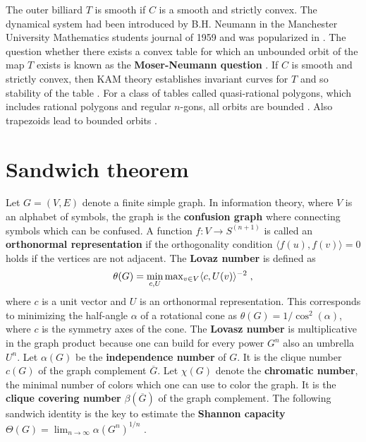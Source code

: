 \documentclass[12pt]{amsart}
\begin{document}
The outer billiard $T$ is smooth if $C$ is a smooth and strictly convex. 
The dynamical system had been introduced by B.H. Neumann in the Manchester University Mathematics
students journal of 1959 \cite{Neumann1959} and was popularized in 
\cite{MoserStableRandom,Mos78}. The question whether there exists a convex table for which
an unbounded orbit of the map $T$ exists is known as the {\bf Moser-Neumann question}
\cite{Schwartz2007,Schwartz2009}. If $C$ is smooth and strictly convex, then KAM theory
establishes invariant curves for $T$ and so stability of the table \cite{Dou82}.
For a class of tables called quasi-rational polygons, which includes rational polygons and 
regular $n$-gons, all orbits are bounded \cite{ViSh87,Kolodziej,GutkinSimanyi}. Also trapezoids
lead to bounded orbits \cite{Li2009}.


\section{Sandwich theorem}

Let $G=(V,E)$ denote a finite simple graph. In information theory, where
$V$ is an alphabet of symbols, the graph is the {\bf confusion graph} where
connecting symbols which can be confused. A function $f: V \to S^(n+1)$
is called an {\bf orthonormal representation} if the orthogonality condition
$\langle f(u),f(v) \rangle=0$ holds if the vertices are not adjacent.
The {\bf Lovaz number} is defined as
$$  \theta(G) = \min_{c,U} {\rm max}_{v \in V} \langle c,U(v) \rangle^{-2}  \; , $$
where $c$ is a unit vector and $U$ is an orthonormal representation.
This corresponds to minimizing the half-angle $\alpha$ of a rotational cone
as $\theta(G) = 1/\cos^2(\alpha)$, where $c$ is the symmetry axes of
the cone. The {\bf Lovasz number} is multiplicative in the graph product because one
can build for every power $G^n$ also an umbrella $U^n$.
Let $\alpha(G)$ be the {\bf independence number} of $G$. It is the clique number $c(G)$
of the graph complement $\overline{G}$. Let $\chi(G)$ denote the {\bf chromatic
number}, the minimal number of colors which one can use to color the graph. It is
the {\bf clique covering number} $\beta(\overline{G})$ of the graph complement. The following
sandwich identity is the key to estimate the {\bf Shannon capacity}
$\Theta(G) = \lim_{n \to \infty} \alpha(G^n)^{1/n}$ \cite{Shannon1956}.
\end{document}
